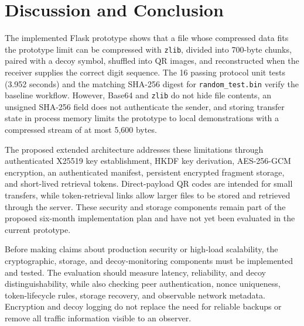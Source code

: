 \documentclass[conference]{IEEEtran}
\begin{document}
\section{Discussion and Conclusion}
The implemented Flask prototype shows that a file whose compressed data fits the prototype limit can be compressed with \texttt{zlib}, divided into 700-byte chunks, paired with a decoy symbol, shuffled into QR images, and reconstructed when the receiver supplies the correct digit sequence. The 16 passing protocol unit tests (3.952 seconds) and the matching SHA-256 digest for \texttt{random\_test.bin} verify the baseline workflow. However, Base64 and \texttt{zlib} do not hide file contents, an unsigned SHA-256 field does not authenticate the sender, and storing transfer state in process memory limits the prototype to local demonstrations with a compressed stream of at most 5,600 bytes.

The proposed extended architecture addresses these limitations through authenticated X25519 key establishment, HKDF key derivation, AES-256-GCM encryption, an authenticated manifest, persistent encrypted fragment storage, and short-lived retrieval tokens. Direct-payload QR codes are intended for small transfers, while token-retrieval links allow larger files to be stored and retrieved through the server. These security and storage components remain part of the proposed six-month implementation plan and have not yet been evaluated in the current prototype.

Before making claims about production security or high-load scalability, the cryptographic, storage, and decoy-monitoring components must be implemented and tested. The evaluation should measure latency, reliability, and decoy distinguishability, while also checking peer authentication, nonce uniqueness, token-lifecycle rules, storage recovery, and observable network metadata. Encryption and decoy logging do not replace the need for reliable backups or remove all traffic information visible to an observer.
\end{document}
